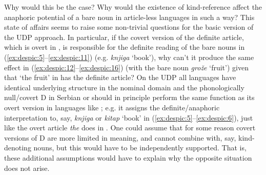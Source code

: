 \documentclass[output=paper,
modfonts
]{langscibook}
\begin{document}
	Why would this be the case? Why would the existence of kind-reference affect the
	anaphoric potential of a bare noun in article-less languages in such a way? This state of affairs
	seems to raise some non-trivial questions for the basic version of the UDP approach. In
	particular, if the covert version of the definite article, which is overt in , is responsible for
	the definite reading of the bare nouns in (\ref{ex:despic:5}--\ref{ex:despic:11}) (e.g. \textit{knjiga} `book'), why can't it produce the
	same effect in (\ref{ex:despic:12}--\ref{ex:despic:16}) (with the bare noun \textit{gro\v z\dj e} `fruit') given that `the fruit' in   has the definite article? On the UDP all languages have identical underlying structure in the
	nominal domain and the phonologically null/covert D in Serbian or  should in principle
	perform the same function as its overt version in languages like ; e.g. it assigns the
	definite/anaphoric interpretation to, say, \textit{knjiga} or \textit{kitap} `book' in (\ref{ex:despic:5}--\ref{ex:despic:6}), just like the overt
	article \textit{the} does in . One could assume that for some reason covert versions of D are more limited in meaning, and cannot combine with, say, kind-denoting nouns, but this would have to be independently supported. That is, these additional assumptions would have to explain why the opposite situation does not arise.
	
\end{document}

